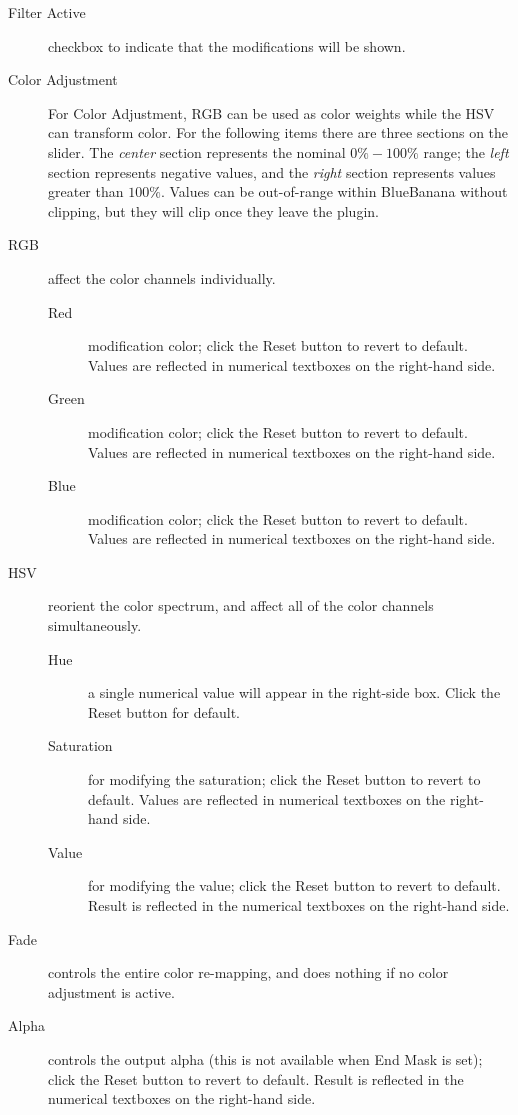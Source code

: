 \begin{description}
    \item[Filter Active] checkbox to indicate that the modifications will be shown.
    \item[Color Adjustment ] For Color Adjustment, RGB can be used as color weights while the HSV can transform color.
    For the following items there are three sections on the slider. The \textit{center} section represents the nominal $0\%-100\%$ range; the \textit{left} section represents negative values, and the \textit{right} section represents values greater than $100\%$. Values can be out-of-range within BlueBanana without clipping, but they will clip once they leave the plugin.
    \item[RGB] affect the color channels individually.
    \begin{description}
        \item[Red] modification color; click the Reset button to revert to default. Values are reflected in numerical textboxes on the right-hand side.
        \item[Green] modification color; click the Reset button to revert to default. Values are reflected in numerical textboxes on the right-hand side.
        \item[Blue] modification color; click the Reset button to revert to default. Values are reflected in numerical textboxes on the right-hand side.
    \end{description}
    \item[HSV] reorient the color spectrum, and affect all of the color channels simultaneously.
    \begin{description}
        \item[Hue] a single numerical value will appear in the right-side box. Click the Reset button for default.
        \item[Saturation] for modifying the saturation; click the Reset button to revert to default. Values are reflected in numerical textboxes on the right-hand side.
        \item[Value] for modifying the value; click the Reset button to revert to default. Result is reflected in the numerical textboxes on the right-hand side.
    \end{description}
    \item[Fade] controls the entire color re-mapping, and does nothing if no color adjustment is active.
    \item[Alpha] controls the output alpha (this is not available when End Mask is set); click the Reset button to revert to default. Result is reflected in the numerical textboxes on the right-hand side.
\end{description}

